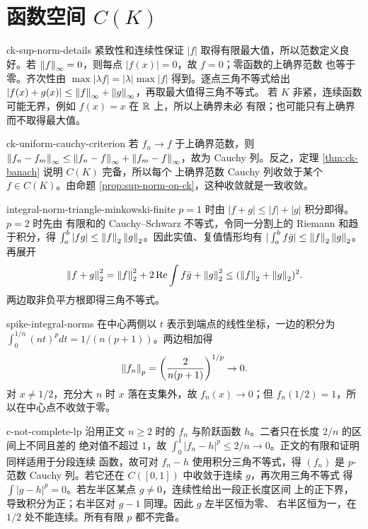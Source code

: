 \chapter{函数空间 \texorpdfstring{$C(K)$}{C(K)}}
\label{chap:continuous-function-space-solutions}

\begin{solution}{ck-sup-norm-details}
紧致性和连续性保证 $|f|$ 取得有限最大值，所以范数定义良好。若
$\left\lVert f\right\rVert_\infty=0$，则每点 $|f(x)|=0$，故 $f=0$；零函数的上确界范数
也等于零。齐次性由
$\max|\lambda f|=|\lambda|\max|f|$ 得到。逐点三角不等式给出
$|f(x)+g(x)|\le\left\lVert f\right\rVert_\infty+\left\lVert g\right\rVert_\infty$，再取最大值得三角不等式。
若 $K$ 非紧，连续函数可能无界，例如 $f(x)=x$ 在 $\mathbb{R}$ 上，所以上确界未必
有限；也可能只有上确界而不取得最大值。
\end{solution}

\begin{solution}{ck-uniform-cauchy-criterion}
若 $f_n\to f$ 于上确界范数，则
$\left\lVert f_n-f_m\right\rVert_\infty\le\left\lVert f_n-f\right\rVert_\infty+\left\lVert f_m-f\right\rVert_\infty$，故为
Cauchy 列。反之，定理 \ref{thm:ck-banach} 说明 $C(K)$ 完备，所以每个
上确界范数 Cauchy 列收敛于某个 $f\in C(K)$。由命题
\ref{prop:sup-norm-on-ck}，这种收敛就是一致收敛。
\end{solution}

\begin{solution}{integral-norm-triangle-minkowski-finite}
$p=1$ 时由 $|f+g|\le|f|+|g|$ 积分即得。$p=2$ 时先由
有限和的 Cauchy--Schwarz 不等式，令同一分割上的 Riemann 和趋于积分，得
$\int_a^b|f g|\le\left\lVert f\right\rVert_2\left\lVert g\right\rVert_2$。因此实值、复值情形均有
$|\int_a^b f\bar g|\le\left\lVert f\right\rVert_2\left\lVert g\right\rVert_2$。再展开
\[
 \left\lVert f+g\right\rVert_2^2=\left\lVert f\right\rVert_2^2+2\operatorname{Re}\int f\bar g+\left\lVert g\right\rVert_2^2
 \le(\left\lVert f\right\rVert_2+\left\lVert g\right\rVert_2)^2.
\]
两边取非负平方根即得三角不等式。
\end{solution}

\begin{solution}{spike-integral-norms}
在中心两侧以 $t$ 表示到端点的线性坐标，一边的积分为
$\int_0^{1/n}(nt)^pdt=1/(n(p+1))$。两边相加得
\[
 \left\lVert f_n\right\rVert_p=\left(\frac{2}{n(p+1)}\right)^{1/p}\to0.
\]
对 $x\ne1/2$，充分大 $n$ 时 $x$ 落在支集外，故 $f_n(x)\to0$；但
$f_n(1/2)=1$，所以在中心点不收敛于零。
\end{solution}

\begin{solution}{c-not-complete-lp}
沿用正文 $n\ge2$ 时的 $f_n$ 与阶跃函数 $h$。二者只在长度 $2/n$ 的区间上不同且差的
绝对值不超过 $1$，故
$\int_0^1|f_n-h|^p\le2/n\to0$。正文的有限和证明同样适用于分段连续
函数，故可对 $f_n-h$ 使用积分三角不等式，得 $(f_n)$ 是 $p$-范数
Cauchy 列。若它还在 $C([0,1])$ 中收敛于连续 $g$，再次用三角不等式
得 $\int|g-h|^p=0$。若左半区某点 $g\ne0$，连续性给出一段正长度区间
上的正下界，导致积分为正；右半区对 $g-1$ 同理。因此 $g$ 左半区恒为零、
右半区恒为一，在 $1/2$ 处不能连续。所有有限 $p$ 都不完备。
\end{solution}

